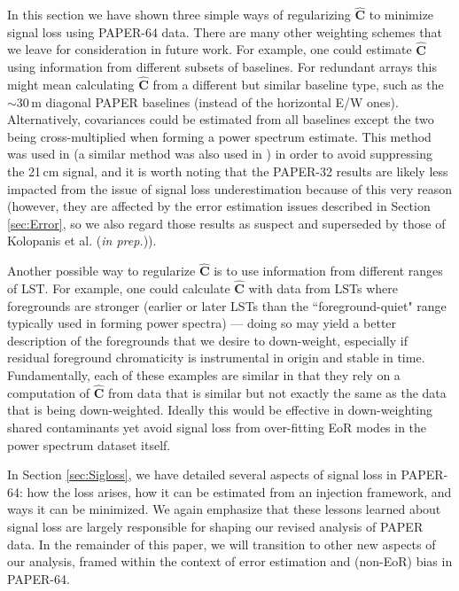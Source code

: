 \documentclass[preprint2,numberedappendix,tighten]{aastex6}  %
\begin{document}
In this section we have shown three simple ways of regularizing $\widehat{\textbf{C}}$ to minimize signal loss using PAPER-64 
data. There are many other weighting schemes that we leave for consideration in future work. For example, one could estimate 
$\widehat{\textbf{C}}$ using information from different subsets of baselines. For redundant arrays this might mean calculating $
\widehat{\textbf{C}}$ from a different but similar baseline type, such as the $\sim30$\,m diagonal PAPER baselines (instead of the 
horizontal E/W ones). Alternatively, covariances could be estimated from all baselines except the two being cross-multiplied 
when forming a power spectrum estimate. This method was used in \citet{parsons_et_al2014} (a similar method was also used in \citet{dillon_et_al2015}) in order to avoid suppressing the 
21\,cm signal, and it is worth noting that the PAPER-32 results are likely less impacted from the issue of signal loss underestimation 
because of this very reason (however, they are affected by the error estimation issues described in Section \ref{sec:Error}, so 
we also regard those results as suspect and superseded by those of Kolopanis et al. (\textit{in prep.})).

Another possible way to regularize $\widehat{\textbf{C}}$ is to use information from different ranges of LST. For example, one could 
calculate $\widehat{\textbf{C}}$ with data from LSTs where foregrounds are stronger (earlier or later LSTs than the ``foreground-quiet" range typically used in forming power spectra) --- doing so may yield a better description of the foregrounds that we desire to 
down-weight, especially if residual foreground chromaticity is instrumental in origin and stable in time. Fundamentally, each of these examples are similar in that they rely on a computation of $\widehat{\textbf{C}}$ from 
data that is similar but not exactly the same as the data that is being down-weighted. Ideally this would be effective in down-weighting shared contaminants yet avoid signal loss from over-fitting EoR modes in the power spectrum dataset itself. 

In Section \ref{sec:Sigloss}, we have detailed several aspects of signal loss in PAPER-64: how the loss arises, how it can be estimated from an injection framework, and ways it can be minimized. We again emphasize that these lessons learned about signal loss are largely responsible for shaping our revised analysis of PAPER data. In the remainder of this paper, we will transition to other new aspects of our analysis, framed within the context of error estimation and (non-EoR) bias in PAPER-64.
\end{document}
